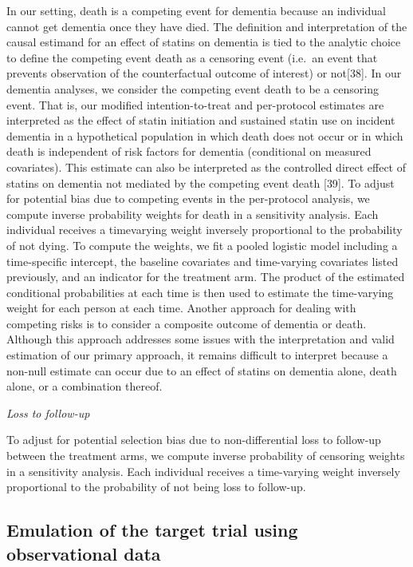 \documentclass[
]{book}
\begin{document}
In our setting, death is a competing event for dementia because an individual cannot get dementia once they have died. The definition and interpretation of the causal estimand for an effect of statins on dementia is tied to the analytic choice to define the competing event death as a censoring event (i.e.~an event that prevents observation of the counterfactual outcome of interest) or not{[}38{]}. In our dementia analyses, we consider the competing event death to be a censoring event. That is, our modified intention-to-treat and per-protocol estimates are interpreted as the effect of statin initiation and sustained statin use on incident dementia in a hypothetical population in which death does not occur or in which death is independent of risk factors for dementia (conditional on measured covariates). This estimate can also be interpreted as the controlled direct effect of statins on dementia not mediated by the competing event death {[}39{]}. To adjust for potential bias due to competing events in the per-protocol analysis, we compute inverse probability weights for death in a sensitivity analysis. Each individual receives a timevarying weight inversely proportional to the probability of not dying. To compute the weights, we fit a pooled logistic model including a time-specific intercept, the baseline covariates and time-varying covariates listed previously, and an indicator for the treatment arm. The product of the estimated conditional probabilities at each time is then used to estimate the time-varying weight for each person at each time. Another approach for dealing with competing risks is to consider a composite outcome of dementia or death. Although this approach addresses some issues with the interpretation and valid estimation of our primary approach, it remains difficult to interpret because a non-null estimate can occur due to an effect of statins on dementia alone, death alone, or a combination thereof.

\emph{Loss to follow-up}

To adjust for potential selection bias due to non-differential loss to follow-up between the treatment arms, we compute inverse probability of censoring weights in a sensitivity analysis. Each individual receives a time-varying weight inversely proportional to the probability of not being loss to follow-up.

\hypertarget{emulation-of-the-target-trial-using-observational-data}{%
\subsection{Emulation of the target trial using observational data}\label{emulation-of-the-target-trial-using-observational-data}}
\end{document}
